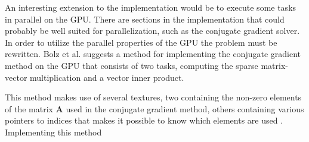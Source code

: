 An interesting extension to the implementation would be to execute some tasks in parallel on the GPU. There are sections in the implementation that could probably be well suited for parallelization, such as the conjugate gradient solver. In order to utilize the parallel properties of the GPU the problem must be rewritten. Bolz et al. \cite{gpu} suggests a method for implementing the conjugate gradient method on the GPU that consists of two tasks, computing the sparse matrix-vector multiplication and a vector inner product.

This method makes use of several textures, two containing the non-zero elements of the matrix $\mathbf{A}$ used in the conjugate gradient method, others containing various pointers to indices that makes it possible to know which elements are used . Implementing this method 
